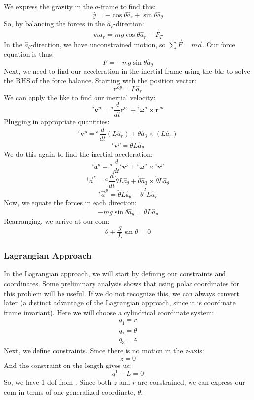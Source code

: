 We express the gravity in the $a$-frame to find this:
$$\hat{y}=-\cos\theta\hat{a}_r+\sin\theta \hat{a}_\theta$$
So, by balancing the forces in the $\hat{a}_r$-direction:
$$m{\ddot{a}}_r=mg\cos\theta \hat{a}_r-\vec{F}_T$$
In the $\hat{a}_\theta$-direction, we have unconstrained motion, so $\sum\vec{F}=m\vec{a}$. Our force equation is thus: 
$$F=-mg\sin\theta\hat{a}_{\theta}$$
Next, we need to find our acceleration in the \gls{inertial frame} using the \gls{bke} to solve the RHS of the force balance. Starting with the position vector:
$$\bm{r}^{op}=L\hat{a}_r$$
We can apply the \gls{bke} to find our inertial velocity:
$${}^i\bm{v}^p={}^a\frac{d}{dt}\bm{r}^{op}+{}^i\bm{\omega}^a\times\bm{r}^{op}$$
Plugging in appropriate quantities:
$${}^i\bm{v}^p={}^a\frac{d}{dt}(L\hat{a}_r)+\dot{\theta}\hat{a}_3\times(L\hat{a}_r)$$
$${}^i\bm{v}^p=\dot{\theta}L\hat{a}_\theta$$
We do this again to find the inertial acceleration:
$${}^i\bm{a}^p={}^a\frac{d}{dt}{}^i\bm{v}^p+{}^i\bm{\omega}^a\times{}^i\bm{v}^p$$
$${}^i\vec{a}^p={}^a\frac{d}{dt}{}\dot{\theta}L\hat{a}_\theta+\dot{\theta}\hat{a}_3\times\dot{\theta}L\hat{a}_\theta$$
$${}^i\vec{a}^p=\ddot{\theta}L\hat{a}_\theta-\dot{\theta}^2L\hat{a}_r$$
Now, we equate the forces in each direction:
$$-mg\sin\theta\hat{a}_\theta=\ddot{\theta}L\hat{a}_\theta$$
Rearranging, we arrive at our \gls{eom}:
$$\ddot{\theta}+\frac{g}{L}\sin\theta=0$$
\subsubsection{Lagrangian Approach}
In the \gls{Lagrangian} approach, we will start by defining our constraints and coordinates. Some preliminary analysis shows that using polar coordinates for this problem will be useful. If we do not recognize this, we can always convert later (a distinct advantage of the \gls{Lagrangian} approach, since it is coordinate frame invariant). Here we will choose a cylindrical coordinate system:
\begin{gather}
    q_1=r\\q_2=\theta\\q_3=z
\end{gather}
Next, we define constraints. Since there is no motion in the z-axis:
$$z=0$$
And the constraint on the length gives us:
$$q^1-L=0$$
So, we have 1 \gls{dof} from . Since both $z$ and $r$ are constrained, we can express our \gls{eom} in terms of one generalized coordinate, $\theta$.

